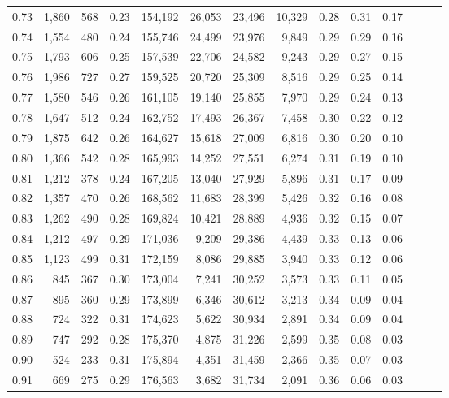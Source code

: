 \begin{tabular}{rrrrrrrrrrrrrr}
0.73 &  1,860 &  568 &  0.23 &  154,192 &   26,053 &  23,496 &  10,329 &  0.28 &  0.31 &      0.17 \\
0.74 &  1,554 &  480 &  0.24 &  155,746 &   24,499 &  23,976 &   9,849 &  0.29 &  0.29 &      0.16 \\
0.75 &  1,793 &  606 &  0.25 &  157,539 &   22,706 &  24,582 &   9,243 &  0.29 &  0.27 &      0.15 \\
0.76 &  1,986 &  727 &  0.27 &  159,525 &   20,720 &  25,309 &   8,516 &  0.29 &  0.25 &      0.14 \\
0.77 &  1,580 &  546 &  0.26 &  161,105 &   19,140 &  25,855 &   7,970 &  0.29 &  0.24 &      0.13 \\
0.78 &  1,647 &  512 &  0.24 &  162,752 &   17,493 &  26,367 &   7,458 &  0.30 &  0.22 &      0.12 \\
0.79 &  1,875 &  642 &  0.26 &  164,627 &   15,618 &  27,009 &   6,816 &  0.30 &  0.20 &      0.10 \\
0.80 &  1,366 &  542 &  0.28 &  165,993 &   14,252 &  27,551 &   6,274 &  0.31 &  0.19 &      0.10 \\
0.81 &  1,212 &  378 &  0.24 &  167,205 &   13,040 &  27,929 &   5,896 &  0.31 &  0.17 &      0.09 \\
0.82 &  1,357 &  470 &  0.26 &  168,562 &   11,683 &  28,399 &   5,426 &  0.32 &  0.16 &      0.08 \\
0.83 &  1,262 &  490 &  0.28 &  169,824 &   10,421 &  28,889 &   4,936 &  0.32 &  0.15 &      0.07 \\
0.84 &  1,212 &  497 &  0.29 &  171,036 &    9,209 &  29,386 &   4,439 &  0.33 &  0.13 &      0.06 \\
0.85 &  1,123 &  499 &  0.31 &  172,159 &    8,086 &  29,885 &   3,940 &  0.33 &  0.12 &      0.06 \\
0.86 &    845 &  367 &  0.30 &  173,004 &    7,241 &  30,252 &   3,573 &  0.33 &  0.11 &      0.05 \\
0.87 &    895 &  360 &  0.29 &  173,899 &    6,346 &  30,612 &   3,213 &  0.34 &  0.09 &      0.04 \\
0.88 &    724 &  322 &  0.31 &  174,623 &    5,622 &  30,934 &   2,891 &  0.34 &  0.09 &      0.04 \\
0.89 &    747 &  292 &  0.28 &  175,370 &    4,875 &  31,226 &   2,599 &  0.35 &  0.08 &      0.03 \\
0.90 &    524 &  233 &  0.31 &  175,894 &    4,351 &  31,459 &   2,366 &  0.35 &  0.07 &      0.03 \\
0.91 &    669 &  275 &  0.29 &  176,563 &    3,682 &  31,734 &   2,091 &  0.36 &  0.06 &      0.03 \\

\end{tabular}
